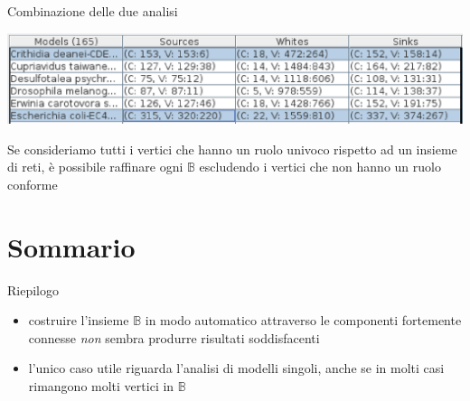 \documentclass{beamer}
\begin{document}
\begin{frame}{Combinazione delle due analisi}
    \begin{center}
      \includegraphics[scale=.5]{images/many-models-with-b-refinement}
  \end{center}
  Se consideriamo tutti i vertici che hanno un ruolo univoco rispetto
  ad un insieme di reti, \`e possibile raffinare ogni $\mathbb{B}$
  escludendo i vertici che non hanno un ruolo conforme
\end{frame}


\section*{Sommario}

\begin{frame}{Riepilogo}
    \begin{itemize}
    \item costruire l'insieme $\mathbb{B}$ in modo automatico
      attraverso le componenti fortemente connesse \emph{non} sembra
      produrre risultati soddisfacenti
    \item l'unico caso utile riguarda l'analisi di modelli singoli,
      anche se in molti casi rimangono molti vertici in $\mathbb{B}$
    \end{itemize}
\end{frame}
\end{document}
